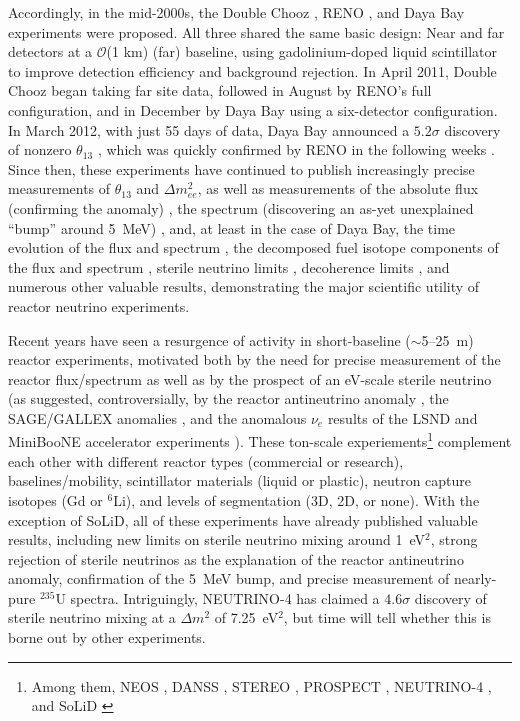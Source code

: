 \documentclass[../thesis.tex]{subfiles}
\begin{document}
Accordingly, in the mid-2000s, the Double Chooz \cite{Ardellier:2006mn}, RENO \cite{Ahn:2010vy}, and Daya Bay \cite{Guo:2007ug} experiments were proposed. All three shared the same basic design: Near and far detectors at a $\mathcal{O}$(1 km) (far) baseline, using gadolinium-doped liquid scintillator to improve detection efficiency and background rejection. In April 2011, Double Chooz began taking far site data, followed in August by RENO's full configuration, and in December by Daya Bay using a six-detector configuration. In March 2012, with just 55 days of data, Daya Bay announced a $5.2\sigma$ discovery of nonzero $\theta_{13}$ \cite{PhysRevLett.108.171803}, which was quickly confirmed by RENO in the following weeks \cite{PhysRevLett.108.191802}. Since then, these experiments have continued to publish increasingly precise measurements of $\theta_{13}$ and $\Delta m^2_{ee}$, as well as measurements of the absolute flux (confirming the anomaly) \cite{PhysRevD.100.052004,Atif:2020eyo,DoubleChooz2020}, the spectrum (discovering an as-yet unexplained ``bump'' around 5~MeV) \cite{PhysRevD.100.052004,Atif:2020eyo,DoubleChooz2020}, and, at least in the case of Daya Bay, the time evolution of the flux and spectrum \cite{PhysRevLett.118.251801}, the decomposed fuel isotope components of the flux and spectrum \cite{PhysRevLett.123.111801}, sterile neutrino limits \cite{PhysRevLett.117.151801}, decoherence limits \cite{DayaBayWavePacket}, and numerous other valuable results, demonstrating the major scientific utility of reactor neutrino experiments.

Recent years have seen a resurgence of activity in short-baseline ($\sim$5--25~m) reactor experiments, motivated both by the need for precise measurement of the reactor flux/spectrum as well as by the prospect of an eV-scale sterile neutrino (as suggested, controversially, by the reactor antineutrino anomaly \cite{PhysRevD.83.073006}, the SAGE/GALLEX anomalies \cite{PhysRevC.80.015807,KAETHER201047}, and the anomalous $\nu_e$ results of the LSND and MiniBooNE accelerator experiments \cite{PhysRevD.64.112007,PhysRevLett.121.221801}). These ton-scale experiements\footnote{Among them, NEOS \cite{PhysRevLett.118.121802}, DANSS \cite{Svirida:2019kbq}, STEREO \cite{PhysRevD.102.052002}, PROSPECT \cite{PhysRevD.103.032001}, NEUTRINO-4 \cite{Serebrov_2020}, and SoLiD \cite{Abreu_2021}} complement each other with different reactor types (commercial or research), baselines/mobility, scintillator materials (liquid or plastic), neutron capture isotopes (Gd or $^6$Li), and levels of segmentation (3D, 2D, or none). With the exception of SoLiD, all of these experiments have already published valuable results, including new limits on sterile neutrino mixing around 1~eV$^2$, strong rejection of sterile neutrinos as the explanation of the reactor antineutrino anomaly, confirmation of the 5~MeV bump, and precise measurement of nearly-pure $^{235}$U spectra. Intriguingly, NEUTRINO-4 has claimed a $4.6\sigma$ discovery of sterile neutrino mixing at a $\Delta m^2$ of 7.25~eV$^2$, but time will tell whether this is borne out by other experiments.
\end{document}
